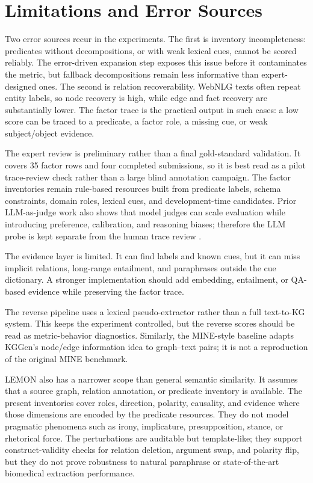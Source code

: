 \section{Limitations and Error Sources}
Two error sources recur in the experiments. The first is inventory incompleteness: predicates without decompositions, or with weak lexical cues, cannot be scored reliably. The error-driven expansion step exposes this issue before it contaminates the metric, but fallback decompositions remain less informative than expert-designed ones. The second is relation recoverability. WebNLG texts often repeat entity labels, so node recovery is high, while edge and fact recovery are substantially lower. The factor trace is the practical output in such cases: a low score can be traced to a predicate, a factor role, a missing cue, or weak subject/object evidence.

The expert review is preliminary rather than a final gold-standard validation. It covers 35 factor rows and four completed submissions, so it is best read as a pilot trace-review check rather than a large blind annotation campaign. The factor inventories remain rule-based resources built from predicate labels, schema constraints, domain roles, lexical cues, and development-time candidates. Prior LLM-as-judge work also shows that model judges can scale evaluation while introducing preference, calibration, and reasoning biases; therefore the LLM probe is kept separate from the human trace review \cite{liu2023geval,zheng2023mtbench}.

The evidence layer is limited. It can find labels and known cues, but it can miss implicit relations, long-range entailment, and paraphrases outside the cue dictionary. A stronger implementation should add embedding, entailment, or QA-based evidence while preserving the factor trace.

The reverse pipeline uses a lexical pseudo-extractor rather than a full text-to-KG system. This keeps the experiment controlled, but the reverse scores should be read as metric-behavior diagnostics. Similarly, the MINE-style baseline adapts KGGen's node/edge information idea to graph--text pairs; it is not a reproduction of the original MINE benchmark.

LEMON also has a narrower scope than general semantic similarity. It assumes that a source graph, relation annotation, or predicate inventory is available. The present inventories cover roles, direction, polarity, causality, and evidence where those dimensions are encoded by the predicate resources. They do not model pragmatic phenomena such as irony, implicature, presupposition, stance, or rhetorical force. The perturbations are auditable but template-like; they support construct-validity checks for relation deletion, argument swap, and polarity flip, but they do not prove robustness to natural paraphrase or state-of-the-art biomedical extraction performance.

